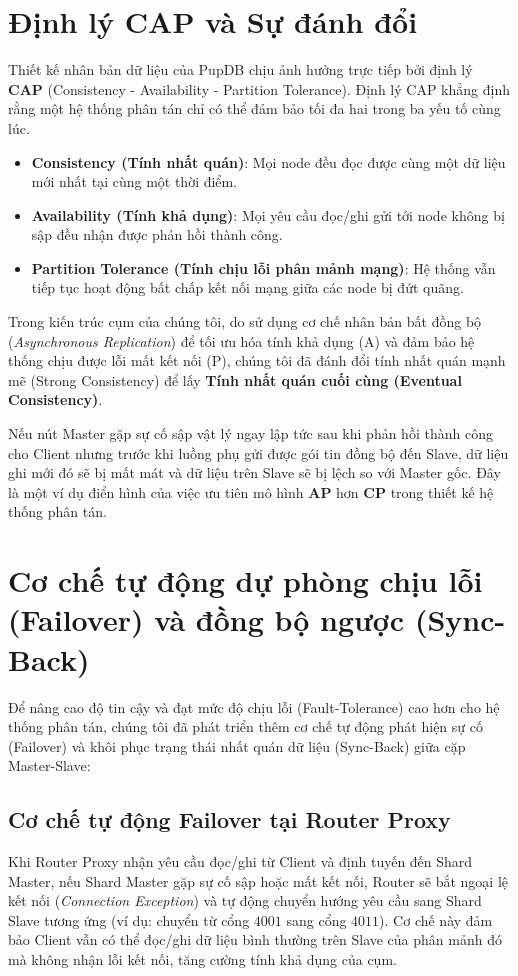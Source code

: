 \documentclass[12pt,a4paper]{report}
\begin{document}
\section{Định lý CAP và Sự đánh đổi}
Thiết kế nhân bản dữ liệu của PupDB chịu ảnh hưởng trực tiếp bởi định lý \textbf{CAP} (Consistency - Availability - Partition Tolerance). Định lý CAP khẳng định rằng một hệ thống phân tán chỉ có thể đảm bảo tối đa hai trong ba yếu tố cùng lúc.

\begin{itemize}
    \item \textbf{Consistency (Tính nhất quán)}: Mọi node đều đọc được cùng một dữ liệu mới nhất tại cùng một thời điểm.
    \item \textbf{Availability (Tính khả dụng)}: Mọi yêu cầu đọc/ghi gửi tới node không bị sập đều nhận được phản hồi thành công.
    \item \textbf{Partition Tolerance (Tính chịu lỗi phân mảnh mạng)}: Hệ thống vẫn tiếp tục hoạt động bất chấp kết nối mạng giữa các node bị đứt quãng.
\end{itemize}

Trong kiến trúc cụm của chúng tôi, do sử dụng cơ chế nhân bản bất đồng bộ (\textit{Asynchronous Replication}) để tối ưu hóa tính khả dụng (A) và đảm bảo hệ thống chịu được lỗi mất kết nối (P), chúng tôi đã đánh đổi tính nhất quán mạnh mẽ (Strong Consistency) để lấy \textbf{Tính nhất quán cuối cùng (Eventual Consistency)}. 

Nếu nút Master gặp sự cố sập vật lý ngay lập tức sau khi phản hồi thành công cho Client nhưng trước khi luồng phụ gửi được gói tin đồng bộ đến Slave, dữ liệu ghi mới đó sẽ bị mất mát và dữ liệu trên Slave sẽ bị lệch so với Master gốc. Đây là một ví dụ điển hình của việc ưu tiên mô hình \textbf{AP} hơn \textbf{CP} trong thiết kế hệ thống phân tán.

\section{Cơ chế tự động dự phòng chịu lỗi (Failover) và đồng bộ ngược (Sync-Back)}
Để nâng cao độ tin cậy và đạt mức độ chịu lỗi (Fault-Tolerance) cao hơn cho hệ thống phân tán, chúng tôi đã phát triển thêm cơ chế tự động phát hiện sự cố (Failover) và khôi phục trạng thái nhất quán dữ liệu (Sync-Back) giữa cặp Master-Slave:

\subsection{Cơ chế tự động Failover tại Router Proxy}
Khi Router Proxy nhận yêu cầu đọc/ghi từ Client và định tuyến đến Shard Master, nếu Shard Master gặp sự cố sập hoặc mất kết nối, Router sẽ bắt ngoại lệ kết nối (\textit{Connection Exception}) và tự động chuyển hướng yêu cầu sang Shard Slave tương ứng (ví dụ: chuyển từ cổng $4001$ sang cổng $4011$). 
Cơ chế này đảm bảo Client vẫn có thể đọc/ghi dữ liệu bình thường trên Slave của phân mảnh đó mà không nhận lỗi kết nối, tăng cường tính khả dụng của cụm.
\end{document}

